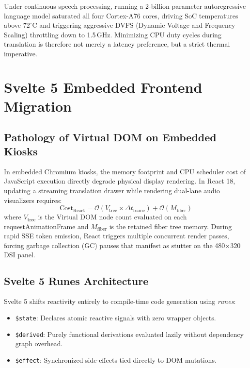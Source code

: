 \documentclass[11pt]{article}
\begin{document}
Under continuous speech processing, running a 2-billion parameter autoregressive language model saturated all four Cortex-A76 cores, driving SoC temperatures above $72^\circ\text{C}$ and triggering aggressive DVFS (Dynamic Voltage and Frequency Scaling) throttling down to 1.5\,GHz. Minimizing CPU duty cycles during translation is therefore not merely a latency preference, but a strict thermal imperative.

\section{Svelte 5 Embedded Frontend Migration}

\subsection{Pathology of Virtual DOM on Embedded Kiosks}
In embedded Chromium kiosks, the memory footprint and CPU scheduler cost of JavaScript execution directly degrade physical display rendering. In React 18, updating a streaming translation drawer while rendering dual-lane audio visualizers requires:
\begin{equation}
\text{Cost}_{\text{React}} = \mathcal{O}(V_{\text{tree}} \times \Delta t_{\text{frame}}) + \mathcal{O}(M_{\text{fiber}})
\end{equation}
where $V_{\text{tree}}$ is the Virtual DOM node count evaluated on each requestAnimationFrame and $M_{\text{fiber}}$ is the retained fiber tree memory. During rapid SSE token emission, React triggers multiple concurrent render passes, forcing garbage collection (GC) pauses that manifest as stutter on the 480$\times$320 DSI panel.

\subsection{Svelte 5 Runes Architecture}
Svelte 5 shifts reactivity entirely to compile-time code generation using \emph{runes}:
\begin{itemize}
    \item \texttt{\$state}: Declares atomic reactive signals with zero wrapper objects.
    \item \texttt{\$derived}: Purely functional derivations evaluated lazily without dependency graph overhead.
    \item \texttt{\$effect}: Synchronized side-effects tied directly to DOM mutations.
\end{itemize}
\end{document}
